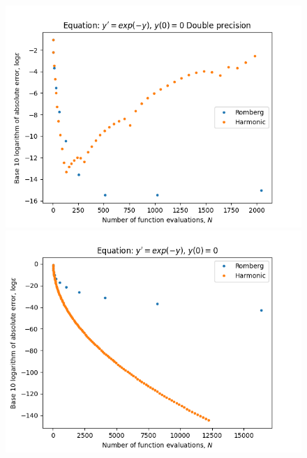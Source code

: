 \begin{figure}[H]
\centering
\begin{minipage}{0.45\textwidth}
\centering
\includegraphics[scale=0.45]{../results/emr_plots/ln_e0.png}
\end{minipage}
\begin{minipage}{0.45\textwidth}
\centering
\includegraphics[scale=0.45]{../results/emr_plots/ln_e0_hp.png}
\end{minipage}
\end{figure}


